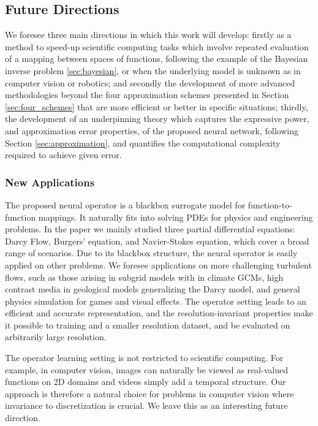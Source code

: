 \subsection{Future Directions}   
We foresee three main directions in which this work will develop: firstly as a method to speed-up scientific computing tasks which involve repeated evaluation of a mapping between spaces of functions, following the example of the Bayesian inverse problem \ref{sec:bayesian}, or when the underlying model is unknown as in computer vision or robotics; 
and secondly the development of more advanced methodologies beyond the four approximation schemes presented in Section \ref{sec:four_schemes} that are more efficient or better in specific situations; thirdly, the development of 
an underpinning theory which captures the expressive power,  and approximation error properties, of the proposed neural network, following Section \ref{sec:approximation}, and
quantifies the computational complexity required to achieve given error.


\subsubsection{New Applications}
The proposed neural operator is a blackbox surrogate model for function-to-function mappings. It naturally fits into solving PDEs for physics and engineering problems. In the paper we mainly studied three partial differential equations: Darcy Flow, Burgers' equation, and Navier-Stokes equation, which cover a broad range of scenarios. Due to its blackbox structure, the neural operator is easily applied on other problems. We foresee applications on more challenging turbulent flows, such as those arising in subgrid models with in climate GCMs, 
high contrast media in geological models generalizing the Darcy model, and general physics simulation for games and visual effects. The operator setting leads to an efficient and accurate representation, and the resolution-invariant properties make it possible to training and a smaller resolution dataset, and be evaluated on arbitrarily large resolution.

The operator learning setting is not restricted to scientific computing. For example, in computer vision, images can naturally be viewed as real-valued functions on 2D domains and videos simply add a temporal structure. Our approach is therefore a natural choice for problems in computer vision where invariance to discretization is crucial. We leave this as an interesting future direction. 


